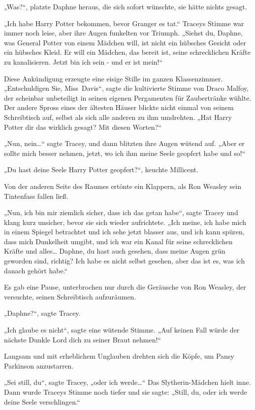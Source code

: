 {„Was?“, platzte Daphne heraus, die sich sofort wünschte, sie hätte nichts gesagt.

„Ich habe Harry Potter bekommen, bevor Granger es tat.“ Traceys Stimme war immer noch leise, aber ihre Augen funkelten vor Triumph. „Siehst du, Daphne, was General Potter von einem Mädchen will, ist nicht ein hübsches Gesicht oder ein hübsches Kleid. Er will ein Mädchen, das bereit ist, seine schrecklichen Kräfte zu kanalisieren. Jetzt bin ich sein - und er ist mein!“

Diese Ankündigung erzeugte eine eisige Stille im ganzen Klassenzimmer. „Entschuldigen Sie, Miss~Davis“, sagte die kultivierte Stimme von Draco Malfoy, der scheinbar unbeteiligt in seinen eigenen Pergamenten für Zaubertränke wühlte. Der andere Spross eines der ältesten Häuser blickte nicht einmal von seinem Schreibtisch auf, selbst als sich alle anderen zu ihm umdrehten. „Hat Harry Potter dir das wirklich gesagt? Mit diesen Worten?“

„Nun, nein…“ sagte Tracey, und dann blitzten ihre Augen wütend auf. „Aber er sollte mich besser nehmen, jetzt, wo ich ihm meine Seele geopfert habe und so!“

„Du hast deine Seele Harry Potter geopfert?“, keuchte Millicent.

Von der anderen Seite des Raumes ertönte ein Klappern, als Ron Weasley sein Tintenfass fallen ließ.

„Nun, ich bin mir ziemlich sicher, dass ich das getan habe“, sagte Tracey und klang kurz unsicher, bevor sie sich wieder aufrichtete. „Ich meine, ich habe mich in einem Spiegel betrachtet und ich sehe jetzt blasser aus, und ich kann spüren, dass mich Dunkelheit umgibt, und ich war ein Kanal für seine schrecklichen Kräfte und alles… Daphne, du hast auch gesehen, dass meine Augen grün geworden sind, richtig? Ich habe es nicht selbst gesehen, aber das ist es, was ich danach gehört habe.“

Es gab eine Pause, unterbrochen nur durch die Geräusche von Ron Weasley, der versuchte, seinen Schreibtisch aufzuräumen.

„Daphne?“, sagte Tracey.

„Ich glaube es nicht“, sagte eine wütende Stimme. „Auf keinen Fall würde der nächste Dunkle Lord dich zu seiner Braut nehmen!“

Langsam und mit erheblichem Unglauben drehten sich die Köpfe, um Pansy Parkinson anzustarren.

„Sei still, du“, sagte Tracey, „oder ich werde…“ Das Slytherin-Mädchen hielt inne. Dann wurde Traceys Stimme noch tiefer und sie sagte: „Still, du, oder ich werde deine Seele verschlingen.“

}
